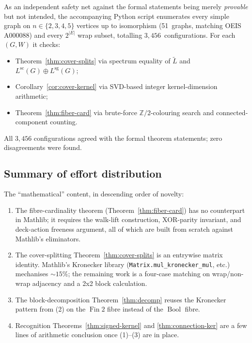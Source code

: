 \documentclass[11pt,a4paper]{amsart}
\theoremstyle{plain}
\theoremstyle{definition}
\theoremstyle{remark}
\newcommand{\ZZ}{\mathbb{Z}}
\newcommand{\tL}{\widetilde{L}}
\newcommand{\Lscalar}{L^{\operatorname{sc}}}
\newcommand{\Lsigned}{L^{\operatorname{sg}}}
\begin{document}
As an independent safety net against the formal statements being
merely \emph{provable} but not intended, the accompanying Python
script  enumerates every
simple graph on
$n\in\{2,3,4,5\}$ vertices up to isomorphism (51~graphs, matching
OEIS A000088) and every $2^{|E|}$ wrap subset, totalling
$3{,}456$~configurations. For each~$(G,W)$ it checks:
\begin{itemize}
  \item Theorem~\ref{thm:cover-splits} via spectrum equality of
    $\tL$ and $\Lscalar(G)\oplus \Lsigned(G)$;
  \item Corollary~\ref{cor:cover-kernel} via SVD-based integer
    kernel-dimension arithmetic;
  \item Theorem~\ref{thm:fiber-card} via brute-force
    $\ZZ/2$-colouring search and connected-component counting.
\end{itemize}
All $3{,}456$ configurations agreed with the formal theorem
statements; zero disagreements were found.

\subsection*{Summary of effort distribution}

The ``mathematical'' content, in descending order of novelty:
\begin{enumerate}[label=\textbf{(\arabic*)}]
  \item The fibre-cardinality theorem
    (Theorem~\ref{thm:fiber-card}) has no counterpart in
    Mathlib; it requires the walk-lift construction,
    XOR-parity invariant, and deck-action freeness argument,
    all of which are built from scratch against Mathlib's
     eliminators.
  \item The cover-splitting Theorem~\ref{thm:cover-splits} is an
    entrywise matrix identity. Mathlib's Kronecker library
    (\texttt{Matrix.mul\_kronecker\_mul}, etc.) mechanises
    $\sim\!15\%$; the remaining work is a four-case matching on
    wrap/non-wrap adjacency and a 2x2 block calculation.
  \item The block-decomposition Theorem~\ref{thm:decomp} reuses
    the Kronecker pattern from (2) on the $\operatorname{Fin}2$
    fibre instead of the $\operatorname{Bool}$ fibre.
  \item Recognition Theorems~\ref{thm:signed-kernel} and
    \ref{thm:connection-ker} are a few lines of arithmetic
    conclusion once (1)--(3) are in place.
\end{enumerate}
\end{document}
